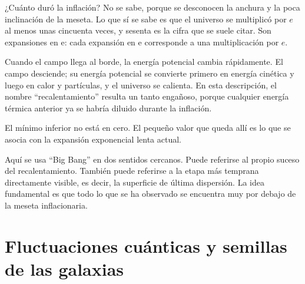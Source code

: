 ¿Cuánto duró la inflación? No se sabe, porque se desconocen la anchura y la poca inclinación de la meseta. Lo que sí se sabe es que el universo se multiplicó por \(e\) al menos unas cincuenta veces, y sesenta es la cifra que se suele citar. Son expansiones en e: cada expansión en e corresponde a una multiplicación por \(e\).

Cuando el campo llega al borde, la energía potencial cambia rápidamente. El campo desciende; su energía potencial se convierte primero en energía cinética y luego en calor y partículas, y el universo se calienta. En esta descripción, el nombre ``recalentamiento'' resulta un tanto engañoso, porque cualquier energía térmica anterior ya se habría diluido durante la inflación.

El mínimo inferior no está en cero. El pequeño valor que queda allí es lo que se asocia con la expansión exponencial lenta actual.

\begin{classroomqa}
\end{classroomqa}

Aquí se usa ``Big Bang'' en dos sentidos cercanos. Puede referirse al propio suceso del recalentamiento. También puede referirse a la etapa más temprana directamente visible, es decir, la superficie de última dispersión. La idea fundamental es que todo lo que se ha observado se encuentra muy por debajo de la meseta inflacionaria.

\begin{classroomqa}
\end{classroomqa}

\section{Fluctuaciones cuánticas y semillas de las galaxias}


